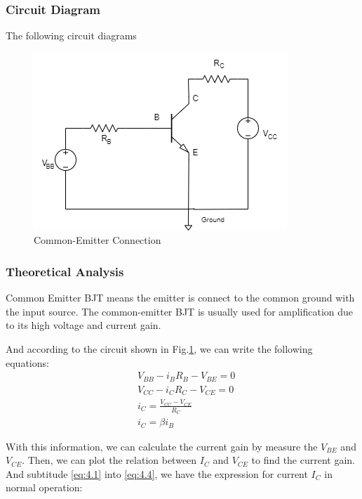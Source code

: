     \subsubsection{Circuit Diagram}
        The following circuit diagrams 
        \begin{figure}[H]
            \centering
                \includegraphics[width=0.6\linewidth]{Experiment_04/Circuits/Lab4.png}
                \caption{Common-Emitter Connection}
                \label{cir:4}
        \end{figure}

    \subsubsection{Theoretical Analysis}
        Common Emitter BJT means the emitter is connect to the common ground with the input source. The common-emitter BJT is usually used for amplification due to its high voltage and current gain.\par

        And according to the circuit shown in Fig.\ref{cir:4}, we can write the following equations:
        \begin{align}
            & V_{BB} - i_BR_B - V_{BE} = 0
            \label{eq:4.1}\\ 
            & V_{CC} - i_CR_C - V_{CE} = 0
            \label{eq:4.2}\\
            & i_C = \frac{V_{CC} - V_{CE}}{R_C}
            \label{eq:4.3}\\
            & i_C = \beta i_B
            \label{eq:4.4}
        \end{align}
        \par

        With this information, we can calculate the current gain by measure the $V_{BE}$ and $V_{CE}$. Then, we can plot the relation between $I_C$ and $V_{CE}$ to find the current gain.
        And subtitude \ref{eq:4.1} into \ref{eq:4.4}, we have the expression for current $I_C$ in normal operation:

